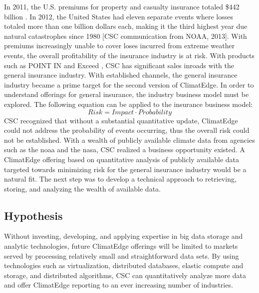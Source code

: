In 2011, the U.S. premiums for property and casualty insurance totaled \$442 billion \cite{iii}. In 2012, the United States had eleven separate events where losses totaled more than one billion dollars each, making it the third highest year due natural catastrophes since 1980  [\textsc{CSC} communication from NOAA, 2013]. With premiums  increasingly unable to cover loses incurred from extreme weather events, the overall profitability of the insurance industry is at risk. With products such as POINT IN \cite{point_in} and Exceed \cite{exceed}, \textsc{CSC} has significant sales inroads with the general insurance industry. With established channels, the general insurance industry became a prime target for the second version of ClimatEdge\texttrademark{}. In order to understand offerings for general insurance, the industry business model must be explored. The following equation can be applied to the insurance  business model: 
\begin{equation*}
    Risk = Impact \cdot Probability
\end{equation*}
\textsc{CSC} recognized that without a substantial quantitative update, ClimatEdge\texttrademark{} could not address the probability of events occurring, thus the overall risk could not be established. With a wealth of publicly available climate data from agencies such as the \gls{noaa} and the \gls{nasa}, \textsc{CSC} realized a business opportunity existed. A ClimatEdge\texttrademark{} offering based on quantitative analysis of publicly available data targeted towards minimizing risk for the general insurance industry would be a natural fit. The next step was to develop a technical approach to retrieving, storing, and analyzing the wealth of available data. 
\subsection{Hypothesis}
Without investing, developing, and applying expertise in big data  storage and analytic technologies, future ClimatEdge\texttrademark{} offerings will be limited to markets served by processing relatively small and straightforward data sets. By using technologies such as virtualization, distributed databases, elastic compute and storage, and distributed algorithms, \textsc{CSC} can quantitatively analyze more data and offer ClimatEdge\texttrademark{} reporting to an ever increasing number of industries.\\

